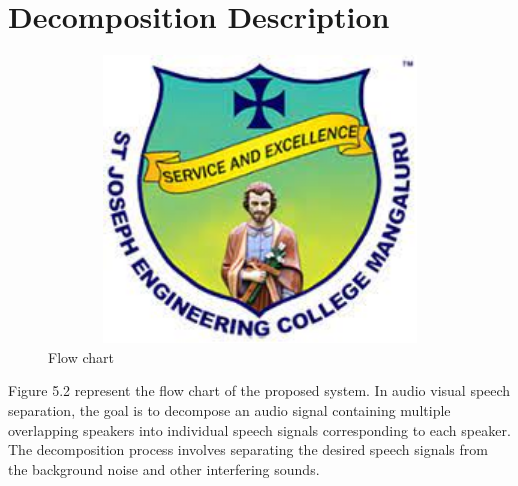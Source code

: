\documentclass[12pt,a4paper]{report}
\begin{document}
\section{Decomposition Description}
\begin{figure}[hbtp]
\centering
\includegraphics[width=5in,height=3in]{./pic/sjeclogo.png}
\caption{Flow chart}
\end{figure}
\newpage
Figure 5.2 represent the flow chart of the proposed system. In audio visual speech separation, the goal is to decompose an audio signal containing multiple overlapping speakers into individual speech signals corresponding to each speaker. The decomposition process involves separating the desired speech signals from the background noise and other interfering sounds.
\end{document}
